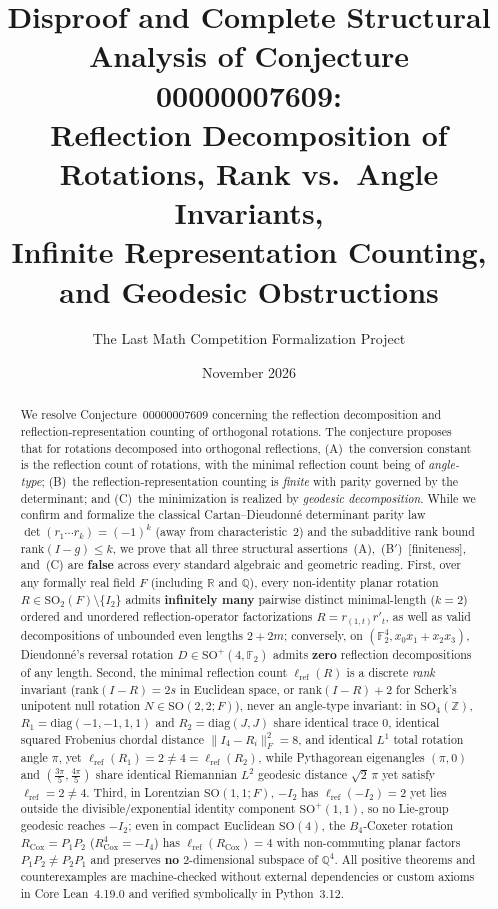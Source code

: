 \documentclass[11pt,a4paper]{article}
\title{\textbf{Disproof and Complete Structural Analysis of Conjecture 00000007609:\\
Reflection Decomposition of Rotations, Rank vs.\ Angle Invariants,\\
Infinite Representation Counting, and Geodesic Obstructions}}
\author{The Last Math Competition Formalization Project}
\date{November 2026}
\theoremstyle{plain}
\theoremstyle{definition}
\newcommand{\R}{\mathbb{R}}
\newcommand{\Q}{\mathbb{Q}}
\newcommand{\Z}{\mathbb{Z}}
\newcommand{\F}{\mathbb{F}}
\newcommand{\SO}{\mathrm{SO}}
\newcommand{\lref}{\ell_{\mathrm{ref}}}
\newcommand{\rk}{\mathrm{rank}}
\begin{document}
\maketitle

\begin{abstract}
We resolve Conjecture~00000007609 concerning the reflection decomposition and reflection-representation counting of orthogonal rotations. The conjecture proposes that for rotations decomposed into orthogonal reflections, (A)~the conversion constant is the reflection count of rotations, with the minimal reflection count being of \emph{angle-type}; (B)~the reflection-representation counting is \emph{finite} with parity governed by the determinant; and (C)~the minimization is realized by \emph{geodesic decomposition}. While we confirm and formalize the classical Cartan--Dieudonn\'e determinant parity law $\det(r_1 \cdots r_k) = (-1)^k$ (away from characteristic~$2$) and the subadditive rank bound $\rk(I - g) \le k$, we prove that all three structural assertions~(A),~(B$'$)~[finiteness], and~(C) are \textbf{false} across every standard algebraic and geometric reading. First, over any formally real field $F$ (including $\R$ and $\Q$), every non-identity planar rotation $R \in \SO_2(F) \setminus \{I_2\}$ admits \textbf{infinitely many} pairwise distinct minimal-length ($k = 2$) ordered and unordered reflection-operator factorizations $R = r_{(1,t)} r'_t$, as well as valid decompositions of unbounded even lengths $2 + 2m$; conversely, on $(\F_2^4, x_0 x_1 + x_2 x_3)$, Dieudonn\'e's reversal rotation $D \in \SO^+(4, \F_2)$ admits \textbf{zero} reflection decompositions of any length. Second, the minimal reflection count $\lref(R)$ is a discrete \emph{rank} invariant ($\rk(I - R) = 2s$ in Euclidean space, or $\rk(I - R) + 2$ for Scherk's unipotent null rotation $N \in \SO(2,2; F)$), never an angle-type invariant: in $\SO_4(\Z)$, $R_1 = \mathrm{diag}(-1,-1,1,1)$ and $R_2 = \mathrm{diag}(J, J)$ share identical trace $0$, identical squared Frobenius chordal distance $\|I_4 - R_i\|_F^2 = 8$, and identical $L^1$ total rotation angle $\pi$, yet $\lref(R_1) = 2 \neq 4 = \lref(R_2)$, while Pythagorean eigenangles $(\pi, 0)$ and $(\frac{3\pi}{5}, \frac{4\pi}{5})$ share identical Riemannian $L^2$ geodesic distance $\sqrt{2}\,\pi$ yet satisfy $\lref = 2 \neq 4$. Third, in Lorentzian $\SO(1,1; F)$, $-I_2$ has $\lref(-I_2) = 2$ yet lies outside the divisible/exponential identity component $\SO^+(1,1)$, so no Lie-group geodesic reaches $-I_2$; even in compact Euclidean $\SO(4)$, the $B_4$-Coxeter rotation $R_{\mathrm{Cox}} = P_1 P_2$ ($R_{\mathrm{Cox}}^4 = -I_4$) has $\lref(R_{\mathrm{Cox}}) = 4$ with non-commuting planar factors $P_1 P_2 \neq P_2 P_1$ and preserves \textbf{no} $2$-dimensional subspace of $\Q^4$. All positive theorems and counterexamples are machine-checked without external dependencies or custom axioms in Core Lean~4.19.0 and verified symbolically in Python~3.12.
\end{abstract}
\end{document}
